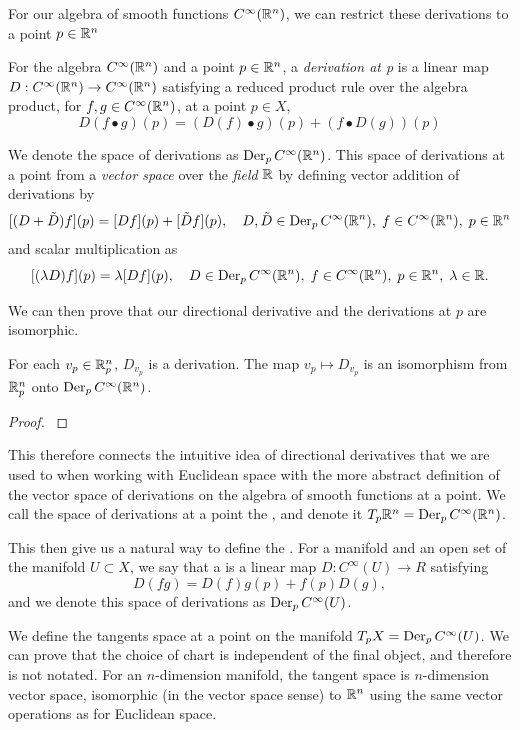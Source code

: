 For our algebra of smooth functions \(C^\infty(\mathbb{R}^n)\), we can restrict these derivations to a point \(p\in \mathbb{R}^n\)
\begin{definition}
	For the algebra \(C^\infty(\mathbb{R}^n)\) and a point \(p\in\mathbb{R}^n\), a \emph{derivation at p} is a linear map \(D: C^\infty(\mathbb{R}^n)\to C^\infty(\mathbb{R}^n)\) satisfying a reduced product rule over the algebra product, for \(f, g \in C^\infty(\mathbb{R}^n)\), at a point \(p\in X\),
	\[D(f \bullet g)(p) = (D(f)\bullet g)(p) + (f \bullet D(g))(p)\]	
\end{definition}
We denote the space of derivations as \(\operatorname{Der}_p C^\infty(\mathbb{R}^n)\).
This space of derivations at a point from a \emph{vector space} over the \emph{field} \(\mathbb{R}\) by defining vector addition of derivations by 
\[[(D + \tilde D)f](p) = [Df](p) + [\tilde Df](p), \quad D, \tilde D\in\operatorname{Der}_p C^\infty(\mathbb{R}^n), \; f \in C^\infty(\mathbb{R}^n),\; p\in \mathbb{R}^n \]
and scalar multiplication as 
\[[(\lambda D)f](p) = \lambda [D f](p), \quad D\in\operatorname{Der}_p C^\infty(\mathbb{R}^n), \; f \in C^\infty(\mathbb{R}^n),\; p\in \mathbb{R}^n, \; \lambda \in \mathbb{R} .\]

We can then prove that our directional derivative and the derivations at \(p\) are isomorphic.
\begin{proposition}
	\1 For each \(v_p\in \mathbb{R}^n_p\), \(D_{v_p}\) is a derivation.
	\2 The map \(v_p \mapsto D_{v_p}\) is an isomorphism from \(\mathbb{R}^n_p\) onto \(\operatorname{Der}_p C^\infty(\mathbb{R}^n)\).
	\0
\end{proposition}
\begin{proof}
	\cite[proposition 3.2]{lee2013smooth}
\end{proof}
This therefore connects the intuitive idea of directional derivatives that we are used to when working with Euclidean space with the more abstract definition of the vector space of derivations on the algebra of smooth functions at a point.
We call the space of derivations at a point the , and denote it \(T_p\mathbb{R}^n = \operatorname{Der}_p C^\infty(\mathbb{R}^n)\).

This then give us a natural way to define the .
For a manifold and an open set of the manifold \(U\subset X\), we say that a  is a linear map \(D:C^\infty(U) \to R\) satisfying
\[
	D(fg) = D(f)g(p) + f(p)D(g),
\]
and we denote this space of derivations as \(\operatorname{Der}_p C^\infty(U)\).

We define the tangents space at a point on the manifold \(T_pX = \operatorname{Der}_p C^\infty(U)\).
We can prove that the choice of chart is independent of the final object, and therefore is not notated.
For an \(n\)-dimension manifold, the tangent space is \(n\)-dimension vector space, isomorphic (in the vector space sense) to \(\mathbb{R}^n\) using the same vector operations as for  Euclidean space.


